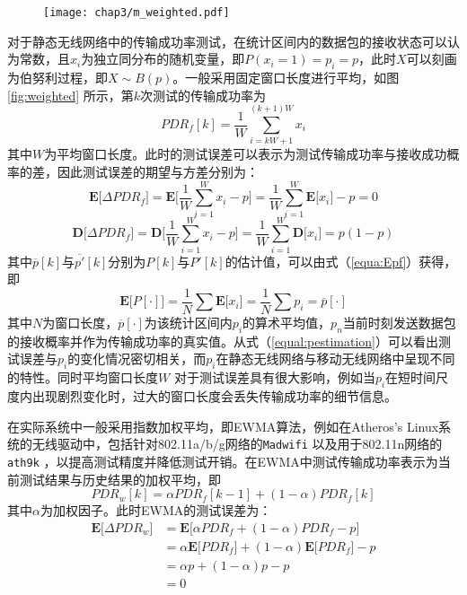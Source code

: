 \begin{figure}[!htp]
\centering
\texttt{[image: chap3/m\_weighted.pdf]}
\end{figure}

对于静态无线网络中的传输成功率测试，在统计区间内的数据包的接收状态可以认为常数，且$x_i$为独立同分布的随机变量，即$P(x_i=1)=p_i=p$，此时$X$可以刻画为伯努利过程，即$X\sim B(p)$。一般采用固定窗口长度进行平均，如图 \ref{fig:weighted} 所示，第$k$次测试的传输成功率为
\begin{equation}
PDR_f[k]=\frac{1}{W}\sum_{i=kW+1}^{(k+1)W}{x_i}
\label{equa:pdr_f}
\end{equation}
其中$W$为平均窗口长度。此时的测试误差可以表示为测试传输成功率与接收成功概率的差，因此测试误差的期望与方差分别为：
\begin{equation}
 \textbf{E[}\Delta PDR_f\textbf{]}=\textbf{E[}\frac{1}{W}\sum_{i=1}^{W}{x_i}-p\textbf{]}=\frac{1}{W}\sum_{i=1}^{W}{\textbf{E[}x_i\textbf{]}}-p=0
\label{equa:Epf}
\end{equation}
\begin{equation}
 \textbf{D[}\Delta PDR_f\textbf{]}=\textbf{D[}\frac{1}{W}\sum_{i=1}^{W}{x_i}-p\textbf{]}=\frac{1}{W}\sum_{i=1}^{W}{\textbf{D[}x_i\textbf{]}}=p(1-p)
\label{equal:Dpf}
\end{equation}
其中$\overline{p}[k]$与$\overline{p'}[k]$分别为$P[k]$与$P'[k]$的估计值，可以由式（\ref{equa:Epf}）获得，即
\begin{equation}
 \textbf{E[}P[\cdot]\textbf{]}=\frac{1}{N}\sum\textbf{E[}x_i\textbf{]}=\frac{1}{N}\sum{p_i}=\overline{p}[\cdot]
\label{equal:pestimation}
\end{equation}
其中$N$为窗口长度，$\overline{p}[\cdot]$为该统计区间内$p_i$的算术平均值，$p_n$当前时刻发送数据包的接收概率并作为传输成功率的真实值。从式（\ref{equal:pestimation}）可以看出测试误差与$p_i$的变化情况密切相关，而$p_i$在静态无线网络与移动无线网络中呈现不同的特性。同时平均窗口长度$W$ 对于测试误差具有很大影响，例如当$p_i$在短时间尺度内出现剧烈变化时，过大的窗口长度会丢失传输成功率的细节信息。

在实际系统中一般采用指数加权平均，即EWMA算法，例如在Atheros's Linux系统的无线驱动中，包括针对802.11a/b/g网络的\texttt{Madwifi} \cite{madwifi} 以及用于802.11n网络的\texttt{ath9k} \cite{ath9k}，以提高测试精度并降低测试开销。在EWMA中测试传输成功率表示为当前测试结果与历史结果的加权平均，即
\begin{equation}
 PDR_w[k]=\alpha PDR_f[k-1]+(1-\alpha)PDR_f[k]
\label{equal:pdr_w}
\end{equation}
其中$\alpha$为加权因子。此时EWMA的测试误差为：
\begin{equation}
\begin{split}
 \textbf{E[}\Delta PDR_w\textbf{]}&=\textbf{E[}\alpha PDR_f+(1-\alpha)PDR_f-p\textbf{]}\\
         &=\alpha \textbf{E[}PDR_f\textbf{]}+(1-\alpha)\textbf{E[}PDR_f\textbf{]}-p\\
         &=\alpha p + (1-\alpha) p-p\\
         &=0
\end{split}
\label{equa:Epw}
\end{equation}

